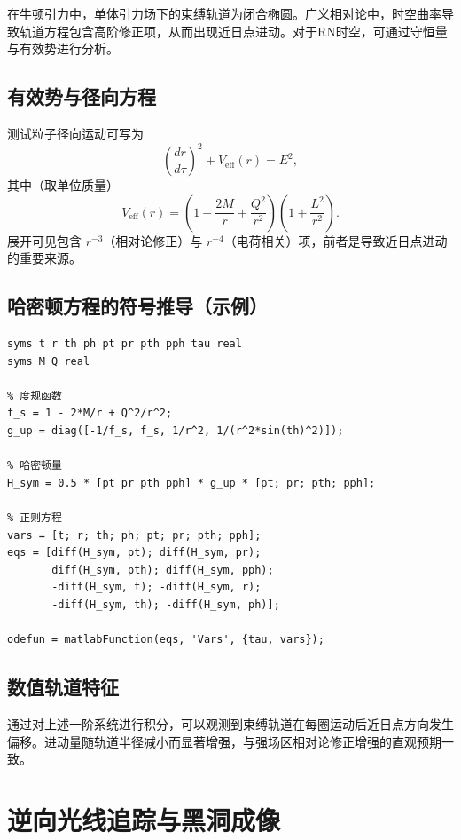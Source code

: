 \documentclass[a4paper,12pt]{article}
\numberwithin{equation}{section}
\begin{document}
在牛顿引力中，单体引力场下的束缚轨道为闭合椭圆。广义相对论中，时空曲率导致轨道方程包含高阶修正项，从而出现近日点进动。对于RN时空，可通过守恒量与有效势进行分析。

\subsection{有效势与径向方程}

测试粒子径向运动可写为
\begin{equation}
\left(\frac{dr}{d\tau}\right)^2+V_{\mathrm{eff}}(r)=E^2,
\end{equation}
其中（取单位质量）
\begin{equation}
V_{\mathrm{eff}}(r)=\left(1-\frac{2M}{r}+\frac{Q^2}{r^2}\right)\left(1+\frac{L^2}{r^2}\right).
\end{equation}
展开可见包含 $r^{-3}$（相对论修正）与 $r^{-4}$（电荷相关）项，前者是导致近日点进动的重要来源。

\subsection{哈密顿方程的符号推导（示例）}

\begin{lstlisting}[caption={哈密顿方程符号推导示例（RN时空）}]
% 定义符号变量
syms t r th ph pt pr pth pph tau real
syms M Q real

% 度规函数
f_s = 1 - 2*M/r + Q^2/r^2;
g_up = diag([-1/f_s, f_s, 1/r^2, 1/(r^2*sin(th)^2)]);

% 哈密顿量
H_sym = 0.5 * [pt pr pth pph] * g_up * [pt; pr; pth; pph];

% 正则方程
vars = [t; r; th; ph; pt; pr; pth; pph];
eqs = [diff(H_sym, pt); diff(H_sym, pr);
       diff(H_sym, pth); diff(H_sym, pph);
       -diff(H_sym, t); -diff(H_sym, r);
       -diff(H_sym, th); -diff(H_sym, ph)];

odefun = matlabFunction(eqs, 'Vars', {tau, vars});
\end{lstlisting}

\subsection{数值轨道特征}

通过对上述一阶系统进行积分，可以观测到束缚轨道在每圈运动后近日点方向发生偏移。进动量随轨道半径减小而显著增强，与强场区相对论修正增强的直观预期一致。

\section{逆向光线追踪与黑洞成像}
\end{document}
